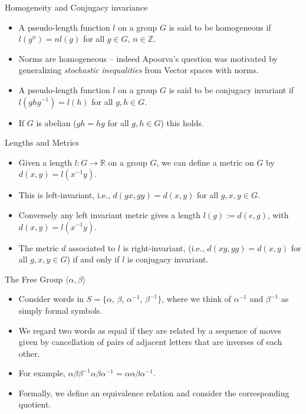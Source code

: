 \documentclass[aspectratio=1610,17pt, ucs]{beamer}
\newcommand{\Z}{\mathbb{Z}}
\newcommand{\R}{\mathbb{R}}
\newcommand{\F}{\langle \alpha, \beta \rangle}
\begin{document}
\begin{frame}{Homogeneity and Conjugacy invariance}
  \begin{itemize}[<+->]
    \item A pseudo-length function $l$ on a group $G$ is said to be \alert{homogeneous} if $l(g^n) = nl(g)$ for all $g\in G$, $n \in\Z$.
    \item Norms are homogeneous -- indeed Apoorva's question was motivated by generalizing \emph{stochastic inequalities}  from Vector spaces with norms.
    \item A pseudo-length function $l$ on a group $G$ is said to be \alert{conjugacy invariant} if $l(ghg^{-1}) = l(h)$ for all $g, h\in G$.
    \item If $G$ is \alert{abelian} ($gh=hg$ for all $g, h\in G$) this holds.
  \end{itemize}

\end{frame}

\begin{frame}{Lengths and Metrics}
  \begin{itemize}[<+->]
    \item Given a length $l: G \to \R$ on a group $G$, we can define a \alert{metric}  on $G$ by $d(x, y) = l(x^{-1}y)$.
    \item This is \alert{left-invariant}, i.e., $d(gx, gy) = d(x, y)$ for all $g, x, y \in G$.
    \item Conversely any left invariant metric gives a length $l(g) := d(e, g)$, with $d(x, y) = l(x^{-1}y)$.
    \item The metric $d$ associated to $l$ is \alert{right-invariant}, (i.e., $d(xg, yg) = d(x, y)$ for all $g, x, y \in G$) if and only if $l$ is \alert{conjugacy invariant}.
  \end{itemize}
\end{frame}

\begin{frame}{The Free Group $\F$}
\begin{itemize}[<+->]
  \item Consider words in $S =\{\alpha$, $\beta$, $\alpha^{-1}$, $\beta^{-1}\}$, where we think of $\alpha^{-1}$ and $\beta^{-1}$ as simply formal symbols.
  \item We regard two words as equal if they are related by a  sequence of moves given by cancellation of pairs of \alert{adjacent} letters that are \alert{inverses}
  of each other.
  \item For example, $\alpha\beta\beta^{-1}\alpha\beta\alpha^{-1} = \alpha\alpha\beta\alpha^{-1}$.
  \item Formally, we define an equivalence relation and consider the corresponding quotient.
  
\end{itemize}
\end{frame}
\end{document}

